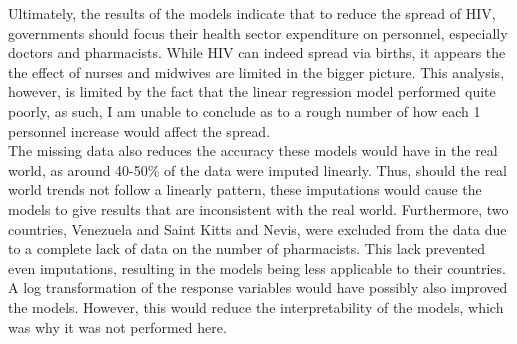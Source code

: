 \documentclass[
  letterpaper,
  DIV=11,
  numbers=noendperiod]{scrartcl}
\begin{document}
Ultimately, the results of the models indicate that to reduce the spread
of HIV, governments should focus their health sector expenditure on
personnel, especially doctors and pharmacists. While HIV can indeed
spread via births, it appears the the effect of nurses and midwives are
limited in the bigger picture. This analysis, however, is limited by the
fact that the linear regression model performed quite poorly, as such, I
am unable to conclude as to a rough number of how each 1 personnel
increase would affect the spread. \\
The missing data also reduces the
accuracy these models would have in the real world, as around 40-50\% of
the data were imputed linearly. Thus, should the real world trends not
follow a linearly pattern, these imputations would cause the models to
give results that are inconsistent with the real world.
Furthermore, two countries, Venezuela and Saint Kitts and Nevis, were excluded from the data due to a complete lack of data on the number
of pharmacists. This lack prevented even imputations, resulting in the
models being less applicable to their countries. \\
A log transformation of
the response variables would have possibly also improved the models.
However, this would reduce the interpretability of the models, which was
why it was not performed here.
\end{document}
